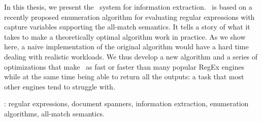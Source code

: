 In this thesis, we present the \rematch\ system for information extraction.
\rematch\ is based on a recently proposed enumeration algorithm for evaluating
regular expressions with capture variables supporting the all-match semantics.
It tells a story of what it takes to make a theoretically optimal algorithm work
in practice. As we show here, a naive implementation of the original algorithm
would have a hard time dealing with realistic workloads. We thus develop a new
algorithm and a series of optimizations that make \rematch\ as fast or faster
than many popular RegEx engines while at the same time being able to return all
the outputs: a task that most other engines tend to struggle with. \

\vfill
{}:  regular expressions, document spanners, information
extraction, enumeration algorithms, all-match semantics.

